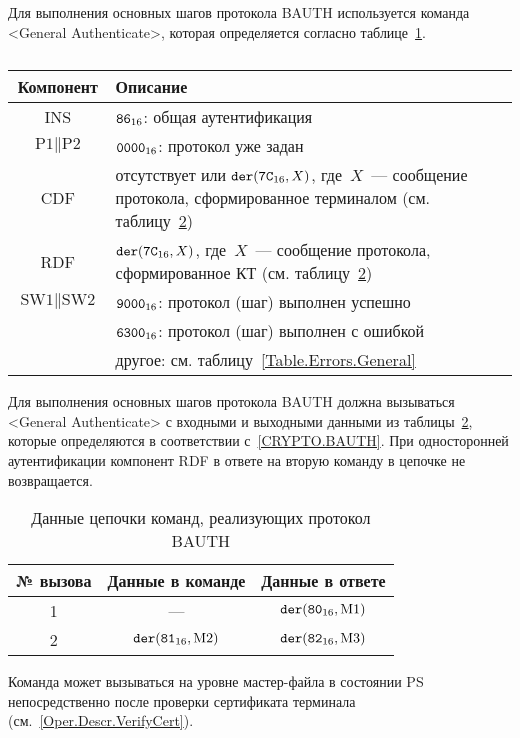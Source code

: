 Для выполнения основных шагов протокола BAUTH 
используется команда <General Authenticate>, 
которая определяется согласно 
таблице~\ref{Table.Oper.GABAUTHCmd}.

\begin{table}[hbt]
\caption{}\label{Table.Oper.GABAUTHCmd}
\begin{tabular}{|c|p{14cm}|}
\hline
Компонент & 	Описание \\
\hline
\hline
INS & $\texttt{86}_{16}$: общая аутентификация \\
\hline
$\text{P1} \parallel \text{P2}$ & $\texttt{0000}_{16}$: протокол уже задан\\ 
\hline
CDF & отсутствует или $\texttt{der}(\texttt{7C}_{16}, X)$, 
где~$X$~--- сообщение протокола, сформированное терминалом
(см. таблицу~\ref{Table.Oper.BAUTH})\\
\hline 
RDF & $\texttt{der}(\texttt{7C}_{16}, X)$, где~$X$~--- 
сообщение протокола, сформированное КТ 
(см. таблицу~\ref{Table.Oper.BAUTH})\\
\hline
$\text{SW1} \parallel \text{SW2}$ & $\texttt{9000}_{16}$: протокол (шаг) выполнен успешно \\
& $\texttt{6300}_{16}$: протокол (шаг) выполнен с ошибкой\\
  & другое: см. таблицу~\ref{Table.Errors.General} \\
\hline
\end{tabular}
\end{table}

Для выполнения основных шагов протокола BAUTH
должна вызываться  <General 
Authenticate> с входными и выходными данными из таблицы~\ref{Table.Oper.BAUTH}, 
которые определяются в соответствии с~\ref{CRYPTO.BAUTH}. 
При односторонней аутентификации компонент RDF в ответе на вторую команду
в цепочке не возвращается.

\begin{table}[hbt]
\caption{Данные цепочки команд, реализующих протокол BAUTH}
\label{Table.Oper.BAUTH}
\begin{tabular}{|c|c|c|}
\hline
№ вызова & Данные в команде & Данные в ответе\\
\hline
\hline
1 & --- & $\texttt{der}(\texttt{80}_{16}, \text{M1})$\\
\hline
2 & $\texttt{der}(\texttt{81}_{16}, \text{M2})$ & 
$\texttt{der}(\texttt{82}_{16}, \text{M3})$  \\
\hline
\end{tabular}
\end{table}

Команда может вызываться на уровне мастер-файла в состоянии PS 
непосредственно после проверки сертификата терминала
(см.~\ref{Oper.Descr.VerifyCert}).

